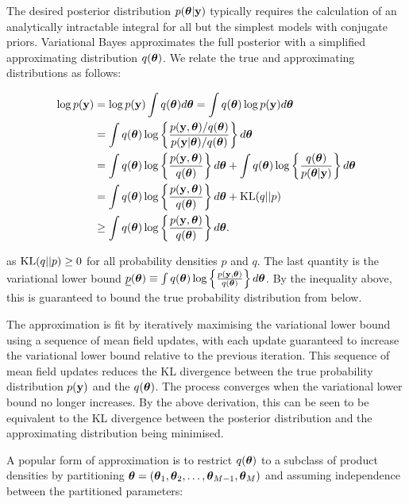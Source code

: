 \documentclass{amsart}[12pt]
\begin{document}
The desired posterior distribution $p({\boldsymbol \theta} | {\bf y})$ typically requires the calculation of an analytically
intractable integral for all but the simplest models with conjugate priors. Variational Bayes approximates the
full posterior with a simplified approximating distribution $q({\boldsymbol \theta})$. We relate the true and
approximating distributions as follows:

\begin{align*}
	\log p({\bf y}) & = \log p({\bf y}) \int q({\boldsymbol \theta}) d {\boldsymbol \theta} = \int q({\boldsymbol \theta}) \log p({\bf y}) d {\boldsymbol \theta}                                    \\
	            & = \int q({\boldsymbol \theta}) \log \left\{ \frac{p({\bf y}, {\boldsymbol \theta}) / q({\boldsymbol \theta})}{p({\bf y}|{\boldsymbol \theta}) / q({\boldsymbol \theta})} \right\} d {\boldsymbol \theta} \\
	            & = \int q({\boldsymbol \theta}) \log\left\{ \frac{p({\bf y}, {\boldsymbol \theta})}{q({\boldsymbol \theta})} \right\} d {\boldsymbol \theta} +                              
	\int q({\boldsymbol \theta}) \log\left\{ \frac{q({\boldsymbol \theta})}{p({\boldsymbol \theta}|{\bf y})} \right\} d {\boldsymbol \theta} \\
	            & = \int q({\boldsymbol \theta}) \log\left\{ \frac{p({\bf y}, {\boldsymbol \theta})}{q({\boldsymbol \theta})} \right\} d {\boldsymbol \theta} +                              
	\text{KL}(q||p) \\
	            & \geq \int q({\boldsymbol \theta}) \log\left\{ \frac{p({\bf y}, {\boldsymbol \theta})}{q({\boldsymbol \theta})} \right\} d {\boldsymbol \theta}.                            
\end{align*}

as $\text{KL}(q||p) \geq 0$ for all probability densities $p$ and $q$. The last quantity is the variational lower
bound $\underline{p}({\boldsymbol \theta}) \equiv \int q({\boldsymbol \theta}) \log\left\{ \frac{p({\bf y}, {\boldsymbol \theta})}{q({\boldsymbol \theta})} \right\}
d{\boldsymbol \theta}$. By the inequality above, this is guaranteed to bound the true probability distribution from below.

The approximation is fit by iteratively maximising the variational lower bound using a sequence of mean field
updates, with each update guaranteed to increase the variational lower bound relative to the previous
iteration. This sequence of mean field updates reduces the KL divergence between the true probability
distribution $p({\bf y})$ and the $q({\boldsymbol \theta})$. The process converges when the variational lower bound no longer
increases. By the above derivation, this can be seen to be equivalent to the KL divergence between the posterior distribution and the approximating distribution being minimised.

A popular form of approximation is to restrict $q({\boldsymbol \theta})$ to a subclass of product densities by partitioning
${\boldsymbol \theta} = ({\boldsymbol \theta}_1, {\boldsymbol \theta}_2, \ldots, {\boldsymbol \theta}_{M-1}, {\boldsymbol \theta}_M)$ and assuming independence between the
partitioned parameters:
\end{document}
